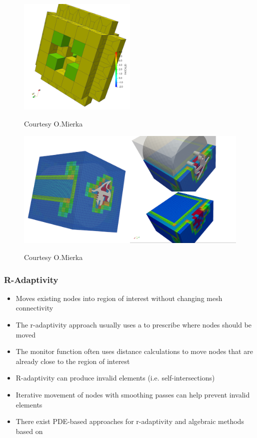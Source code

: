 \begin{frame}
\begin{figure}[h!]
\centering
\includegraphics[width=0.5\textwidth]{screenshots/P4.png}
\label{fig:domains}
\caption{Courtesy O.Mierka}
\end{figure}
\end{frame}

\begin{frame}
\begin{figure}[h!]
\centering
\includegraphics[width=1.\textwidth]{screenshots/GEO_BIW.png}
\label{fig:domains}
\caption{Courtesy O.Mierka}
\end{figure}
\end{frame}

\begin{frame}
\frametitle{R-Adaptivity}
\begin{itemize}
\item Moves existing nodes into region of interest without changing mesh connectivity
\item The r-adaptivity approach usually uses a  to prescribe where nodes should be moved
\item The monitor function often uses distance calculations to move nodes that are already close to the region of interest
\item R-adaptivity can produce invalid elements (i.e. self-intersections) 
\item Iterative movement of nodes with smoothing passes can help prevent invalid elements
\item There exist PDE-based approaches \cite{GrajewskiKoesterTurek2008b} for r-adaptivity and algebraic methods based on  \cite{Muenster:2016}
\end{itemize}
\end{frame}

